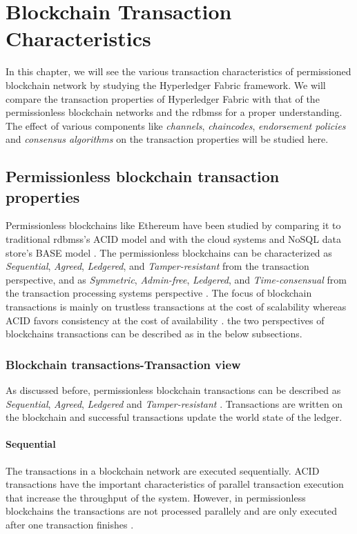 \documentclass[
  a4paper,  %
  twoside,  %
  bibliography=totoc,
  headsepline,
  cleardoublepage=empty,
  parskip=half,
  draft=false
]{scrbook}
\begin{document}
\chapter{Blockchain Transaction Characteristics}
In this chapter, we will see the various transaction characteristics of permissioned blockchain network by studying the Hyperledger Fabric framework. We will compare the transaction properties of Hyperledger Fabric with that of the permissionless blockchain networks and the \glspl{rdbms} for a proper understanding. The effect of various components like \textit{channels}, \textit{chaincodes}, \textit{endorsement policies} and \textit{consensus algorithms} on the transaction properties will be studied here.
\label{chap:tc}

\section{Permissionless blockchain transaction properties}
Permissionless blockchains like Ethereum have been studied by comparing it to traditional \glspl{rdbms}'s ACID model and with the cloud systems and NoSQL data store's BASE model \cite{Salt}. The permissionless blockchains can be characterized as \textit{Sequential}, \textit{Agreed}, \textit{Ledgered}, and \textit{Tamper-resistant} from the transaction perspective, and as \textit{Symmetric}, \textit{Admin-free}, \textit{Ledgered}, and \textit{Time-consensual} from the transaction processing systems perspective \cite{Salt}. The focus of blockchain transactions is mainly on trustless transactions at the cost of scalability whereas ACID favors consistency at the cost of availability \cite{Tai}. the two perspectives of blockchains transactions can be described as in the below subsections. 

\subsection{Blockchain transactions-Transaction view}
As discussed before, permissionless blockchain transactions can be described as \textit{Sequential}, \textit{Agreed}, \textit{Ledgered} and \textit{Tamper-resistant} \cite{Salt}. Transactions are written on the blockchain and successful transactions update the world state of the ledger.

\subsubsection{Sequential}
The transactions in a blockchain network are executed sequentially. ACID transactions have the important characteristics of parallel transaction execution that increase the throughput of the system. However, in permissionless blockchains the transactions are not processed parallely and are only executed after one transaction finishes \cite{Salt}.
\end{document}
